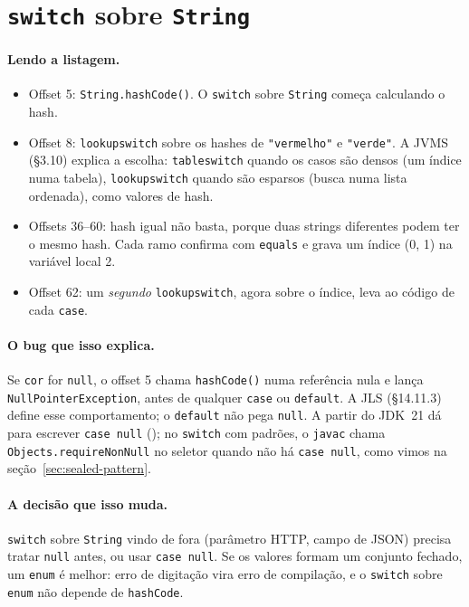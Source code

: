 \section{\texttt{switch} sobre \texttt{String}}
\label{sec:switch}




\paragraph{Lendo a listagem.}
\begin{itemize}
\item Offset 5: \texttt{String.hashCode()}. O \texttt{switch} sobre
  \texttt{String} começa calculando o hash.
\item Offset 8: \texttt{lookupswitch} sobre os hashes de
  \texttt{"vermelho"} e \texttt{"verde"}. A JVMS (§3.10) explica a
  escolha: \texttt{tableswitch} quando os casos são densos (um índice
  numa tabela), \texttt{lookupswitch} quando são esparsos (busca numa
  lista ordenada), como valores de hash.
\item Offsets 36--60: hash igual não basta, porque duas strings
  diferentes podem ter o mesmo hash. Cada ramo confirma com
  \texttt{equals} e grava um índice (0, 1) na variável local 2.
\item Offset 62: um \emph{segundo} \texttt{lookupswitch}, agora sobre o
  índice, leva ao código de cada \texttt{case}.
\end{itemize}

\paragraph{O bug que isso explica.}
Se \texttt{cor} for \texttt{null}, o offset 5 chama \texttt{hashCode()}
numa referência nula e lança \texttt{NullPointerException}, antes de
qualquer \texttt{case} ou \texttt{default}. A JLS (§14.11.3) define esse
comportamento; o \texttt{default} não pega \texttt{null}. A partir do
JDK~21 dá para escrever \texttt{case null} (); no
\texttt{switch} com padrões, o \texttt{javac} chama
\texttt{Objects.requireNonNull} no seletor quando não há
\texttt{case null}, como vimos na seção~\ref{sec:sealed-pattern}.

\paragraph{A decisão que isso muda.}
\texttt{switch} sobre \texttt{String} vindo de fora (parâmetro HTTP,
campo de JSON) precisa tratar \texttt{null} antes, ou usar
\texttt{case null}. Se os valores formam um conjunto fechado, um
\texttt{enum} é melhor: erro de digitação vira erro de compilação, e o
\texttt{switch} sobre \texttt{enum} não depende de \texttt{hashCode}.
